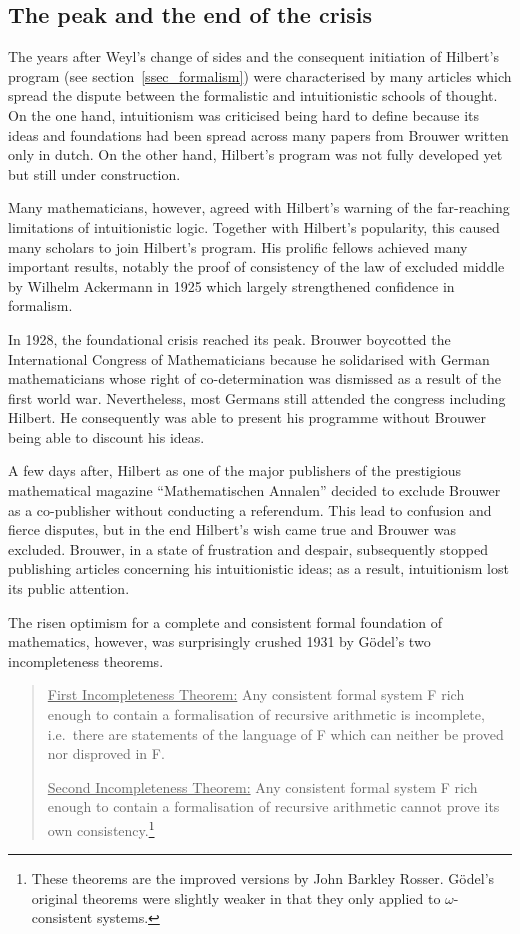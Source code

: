 \documentclass[hidelinks]{article}
\begin{document}
\subsection{The peak and the end of the crisis}\label{ssec_end_crisis}
The years after Weyl's change of sides and the consequent initiation of Hilbert's program (see section~\ref{ssec_formalism}) were characterised by many articles which spread the dispute between the formalistic and intuitionistic schools of thought. On the one hand, intuitionism was criticised being hard to define because its ideas and foundations had been spread across many papers from Brouwer written only in dutch. On the other hand, Hilbert's program was not fully developed yet but still under construction.

Many mathematicians, however, agreed with Hilbert's warning of the far-reaching limitations of intuitionistic logic. Together with Hilbert's popularity, this caused many scholars to join Hilbert's program. His prolific fellows achieved many important results, notably the proof of consistency of the law of excluded middle by Wilhelm Ackermann in 1925 which largely strengthened confidence in formalism.

In 1928, the foundational crisis reached its peak. Brouwer boycotted the International Congress of Mathematicians because he solidarised with German mathematicians whose right of co-determination was dismissed as a result of the first world war. Nevertheless, most Germans still attended the congress including Hilbert. He consequently was able to present his programme without Brouwer being able to discount his ideas.

A few days after, Hilbert as one of the major publishers of the prestigious mathematical magazine ``Mathematischen Annalen'' decided to exclude Brouwer as a co-publisher without conducting a referendum. This lead to confusion and fierce disputes, but in the end Hilbert's wish came true and Brouwer was excluded. Brouwer, in a state of frustration and despair, subsequently stopped publishing articles concerning his intuitionistic ideas; as a result, intuitionism lost its public attention.  

The risen optimism for a complete and consistent formal foundation of mathematics, however, was surprisingly crushed 1931 by Gödel's two incompleteness theorems.

\begin{quote}
\underline{First Incompleteness Theorem:} Any consistent formal system F rich enough to contain a formalisation of recursive arithmetic is incomplete, i.e.\ there are statements of the language of F which can neither be proved nor disproved in F.

\underline{Second Incompleteness Theorem:} Any consistent formal system F rich enough to contain a formalisation of recursive arithmetic cannot prove its own consistency.\footnote{These theorems are the improved versions by John Barkley Rosser. Gödel's original theorems were slightly weaker in that they only applied to $\omega$-consistent systems.\cite[pp.~293--320]{fraenkel_incompleteness}}
\end{quote}
\end{document}
